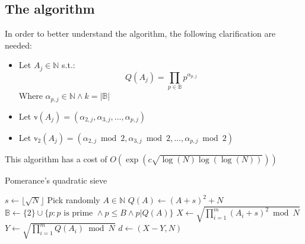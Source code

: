 \subsection{The algorithm}
In order to better understand the algorithm, the following clarification are needed:
\begin{itemize}
    \item Let $A_{j} \in \mathbb{N}$ s.t.:
    \[
    Q(A_{j}) = \prod_{p \in \mathbb{B}}p^{\alpha_{p,j}}
    \]
    Where $\alpha_{p,j} \in \mathbb{N} \land k = |\mathbb{B}|$
    \item Let $\mathbb{v}(A_{j}) = (\alpha_{2,j}, \alpha_{3,j}, \dots, \alpha_{p,j})$
    \item Let $\mathbb{v}_{2}(A_{j}) = (\alpha_{2,j} \bmod 2, \alpha_{3,j} \bmod 2, \dots, \alpha_{p,j} \bmod 2)$
\end{itemize}
This algorithm has a cost of $O(\operatorname{exp}(c \sqrt{\operatorname{log}(N)\operatorname{log}(\operatorname{log}(N))}))$

\begin{algorithm}
\caption{Pomerance's quadratic sieve}\label{alg:pomerance_sieve}
$s \gets \lfloor \sqrt{N} \rfloor$\;
Pick randomly $A \in \mathbb{N}$\;
$Q(A) \gets (A + s)^{2} + N$\;
$\mathbb{B} \gets \{2\} \cup \{p: p \text{ is prime } \land p \leq B \land p | Q(A)\}$\;
$X \gets \sqrt{\prod_{i=1}^{m}(A_{i} + s)^{2} \bmod N}$\;
$Y \gets \sqrt{\prod_{i=1}^{m} Q(A_{i}) \bmod N}$\;
$d \gets (X - Y, N)$\;
\end{algorithm}
